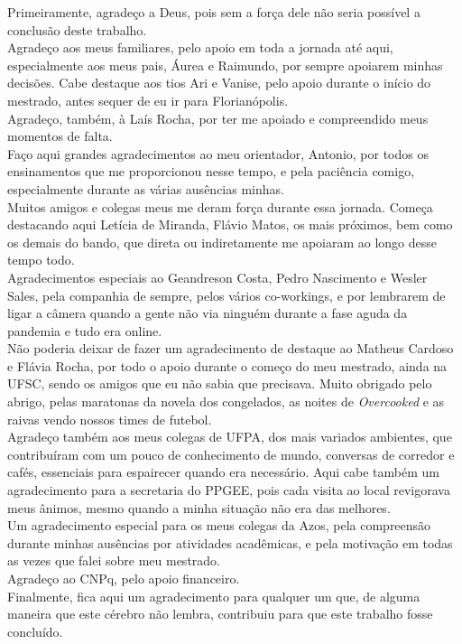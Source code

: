 \documentclass[
	12pt,				%
	openright,			%
	oneside,			%
	a4paper,			%
	chapter=TITLE,		%
	english,			%
	french,				%
	spanish,			%
	brazil				%
	]{abntex2}
\theoremstyle{definition}
\begin{document}
\begin{agradecimentos}
Primeiramente, agradeço a Deus, pois sem a força dele não seria possível a conclusão deste trabalho.\\
Agradeço aos meus familiares, pelo apoio em toda a jornada até aqui, especialmente aos meus pais, Áurea e Raimundo, por sempre apoiarem minhas decisões. Cabe destaque aos tios Ari e Vanise, pelo apoio durante o início do mestrado, antes sequer de eu ir para Florianópolis.\\
Agradeço, também, à Laís Rocha, por ter me apoiado e compreendido meus momentos de falta.\\
Faço aqui grandes agradecimentos ao meu orientador, Antonio, por todos os ensinamentos que me proporcionou nesse tempo, e pela paciência comigo, especialmente durante as várias ausências minhas.\\
Muitos amigos e colegas meus me deram força durante essa jornada. Começa destacando aqui Letícia de Miranda, Flávio Matos, os mais próximos, bem como os demais do bando, que direta ou indiretamente me apoiaram ao longo desse tempo todo.\\
Agradecimentos especiais ao Geandreson Costa, Pedro Nascimento e Wesler Sales, pela companhia de sempre, pelos vários co-workings, e por lembrarem de ligar a câmera quando a gente não via ninguém durante a fase aguda da pandemia e tudo era online.\\
Não poderia deixar de fazer um agradecimento de destaque ao Matheus Cardoso e Flávia Rocha, por todo o apoio durante o começo do meu mestrado, ainda na UFSC, sendo os amigos que eu não sabia que precisava. Muito obrigado pelo abrigo, pelas maratonas da novela dos congelados, as noites de \textit{Overcooked} e as raivas vendo nossos times de futebol.\\
Agradeço também aos meus colegas de UFPA, dos mais variados ambientes, que contribuíram com um pouco de conhecimento de mundo, conversas de corredor e cafés, essenciais para espairecer quando era necessário. Aqui cabe também um agradecimento para a secretaria do PPGEE, pois cada visita ao local revigorava meus ânimos, mesmo quando a minha situação não era das melhores.\\
Um agradecimento especial para os meus colegas da Azos, pela compreensão durante minhas ausências por atividades acadêmicas, e pela motivação em todas as vezes que falei sobre meu mestrado.\\
Agradeço ao CNPq, pelo apoio financeiro.\\
Finalmente, fica aqui um agradecimento para qualquer um que, de alguma maneira que este cérebro não lembra, contribuiu para que este trabalho fosse concluído.
\end{agradecimentos}
\end{document}
